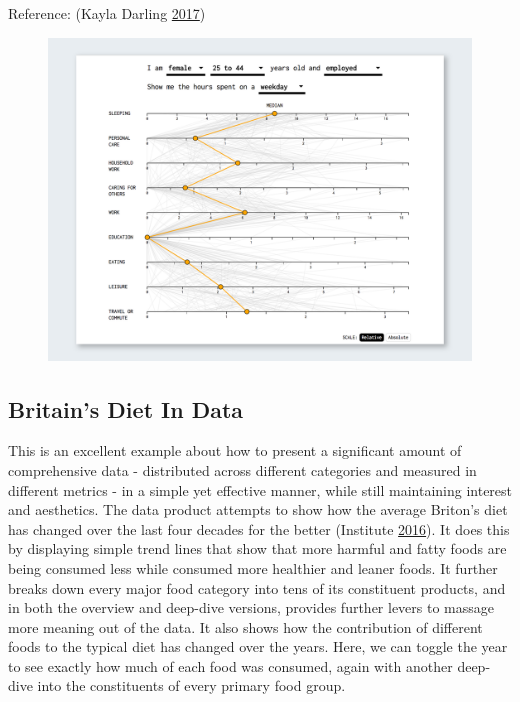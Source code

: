 \documentclass[]{book}
\theoremstyle{definition}
\theoremstyle{definition}
\theoremstyle{definition}
\theoremstyle{remark}
\begin{document}
Reference: (Kayla Darling \protect\hyperlink{ref-cool_data}{2017})

\begin{figure}
\centering
\includegraphics{images/SpendingTime.png}
\caption{}
\end{figure}

\subsection{Britain's Diet In Data}\label{britains-diet-in-data}

This is an excellent example about how to present a significant amount
of comprehensive data - distributed across different categories and
measured in different metrics - in a simple yet effective manner, while
still maintaining interest and aesthetics. The data product attempts to
show how the average Briton's diet has changed over the last four
decades for the better (Institute
\protect\hyperlink{ref-britain_diet_2016}{2016}). It does this by
displaying simple trend lines that show that more harmful and fatty
foods are being consumed less while consumed more healthier and leaner
foods. It further breaks down every major food category into tens of its
constituent products, and in both the overview and deep-dive versions,
provides further levers to massage more meaning out of the data. It also
shows how the contribution of different foods to the typical diet has
changed over the years. Here, we can toggle the year to see exactly how
much of each food was consumed, again with another deep-dive into the
constituents of every primary food group.
\end{document}
